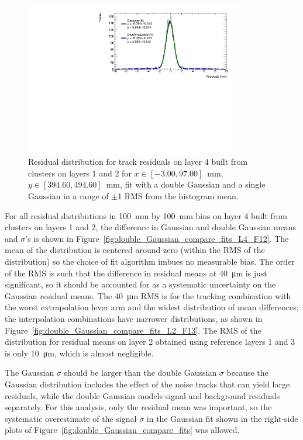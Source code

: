 \begin{figure}
    \centering
    \includegraphics[width = 0.85\textwidth]{figures/figure_double_gaus_vs_gaus_example_fit_QL2P08_3100V_2021-06-18_and_2021-07-19_xbin_10_ybin_5_layer4_fixedlayers12.pdf}
    \caption{Residual distribution for track residuals on layer 4 built from clusters on layers 1 and 2 for $x\in\left[-3.00, 97.00\right]$~mm,  $y\in\left[394.60, 494.60\right]$~mm, fit with a double Gaussian and a single Gaussian in a range of $\pm$1 RMS from the histogram mean.}
    \label{fig:double_Gaussian_example_fit}
\end{figure}

For all residual distributions in \SI{100}{\milli\meter} by \SI{100}{\milli\meter} bins on layer 4 built from clusters on layers 1 and 2, the difference in Gaussian and double Gaussian means and $\sigma$'s is shown in Figure~\ref{fig:double_Gaussian_compare_fits_L4_F12}. The mean of the distribution is centered around zero (within the RMS of the distribution) so the choice of fit algorithm imbues no measurable bias. The order of the RMS is such that the difference in residual means at \SI{40}{\micro\meter} is just significant, so it should be accounted for as a systematic uncertainty on the Gaussian residual means. The \SI{40}{\micro\meter} RMS is for the tracking combination with the worst extrapolation lever arm and the widest distribution of mean differences; the interpolation combinations have narrower distributions, as shown in Figure~\ref{fig:double_Gaussian_compare_fits_L2_F13}. The RMS of the distribution for residual means on layer 2 obtained using reference layers 1 and 3 is only \SI{10}{\micro\meter}, which is almost negligible.

The Gaussian $\sigma$ should be larger than the double Gaussian $\sigma$ because the Gaussian distribution includes the effect of the noise tracks that can yield large residuals, while the double Gaussian models signal and background residuals separately. For this analysis, only the residual mean was important, so the systematic overestimate of the signal $\sigma$ in the Gaussian fit shown in the right-side plots of Figure~\ref{fig:double_Gaussian_compare_fits} was allowed.

